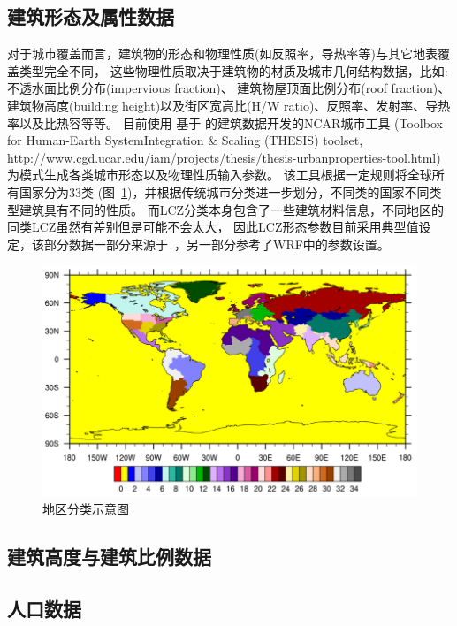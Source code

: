 \subsection{建筑形态及属性数据}\label{建筑形态及属性数据}
对于城市覆盖而言，建筑物的形态和物理性质(如反照率，导热率等)与其它地表覆盖类型完全不同，
这些物理性质取决于建筑物的材质及城市几何结构数据，比如: 不透水面比例分布(impervious fraction)、
建筑物屋顶面比例分布(roof fraction)、建筑物高度(building height)以及街区宽高比(H/W ratio)、反照率、发射率、导热率以及比热容等等。
目前使用 \citet{oleson2020parameterization} 基于 \citet{jackson2013parameterization} 的建筑数据开发的NCAR城市工具
(Toolbox for Human-Earth SystemIntegration \& Scaling (THESIS) toolset, http://www.cgd.ucar.edu/iam/projects/thesis/thesis-urbanproperties-tool.html)
为模式生成各类城市形态以及物理性质输入参数。
该工具根据一定规则将全球所有国家分为33类 (图~\ref{fig:地区分类})，并根据传统城市分类进一步划分，不同类的国家不同类型建筑具有不同的性质。
%
而LCZ分类本身包含了一些建筑材料信息，不同地区的同类LCZ虽然有差别但是可能不会太大，
因此LCZ形态参数目前采用典型值设定，该部分数据一部分来源于~\citet{stewart2014evaluation}，另一部分参考了WRF中的参数设置。
{
\begin{figure}[]
\centering
\includegraphics{Figures/基础数据/地区分类.png}
\caption{地区分类示意图}
\label{fig:地区分类}
\end{figure}
}
\subsection{建筑高度与建筑比例数据}\label{建筑高度与建筑比例数据}

\subsection{人口数据}\label{人口数据}

